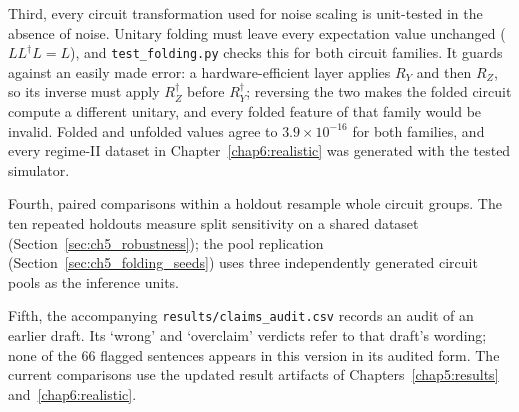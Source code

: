 \documentclass[Thesis.tex]{subfiles}
\begin{document}
Third, every circuit transformation used for noise scaling is unit-tested in the
absence of noise. Unitary folding must leave every expectation value unchanged
($L L^{\dagger} L = L$), and \texttt{test\_folding.py} checks this for both circuit
families. It guards against an easily made error: a hardware-efficient layer
applies $R_Y$ and then $R_Z$, so its inverse must apply $R_Z^{\dagger}$ before
$R_Y^{\dagger}$; reversing the two makes the folded circuit compute a different
unitary, and every folded feature of that family would be invalid. Folded and
unfolded values agree to $3.9 \times 10^{-16}$ for both families, and every
regime-II dataset in Chapter~\ref{chap6:realistic} was generated with the tested
simulator.

Fourth, paired comparisons within a holdout resample whole circuit groups.
The ten repeated holdouts measure split sensitivity on a shared dataset
(Section~\ref{sec:ch5_robustness}); the pool replication
(Section~\ref{sec:ch5_folding_seeds}) uses three independently generated circuit
pools as the inference units.

Fifth, the accompanying \texttt{results/claims\_audit.csv} records an audit of an
earlier draft. Its `wrong' and `overclaim' verdicts refer to that draft's wording;
none of the $66$ flagged sentences appears in this version in its audited form. The
current comparisons use the updated result artifacts of
Chapters~\ref{chap5:results} and~\ref{chap6:realistic}.
\end{document}
